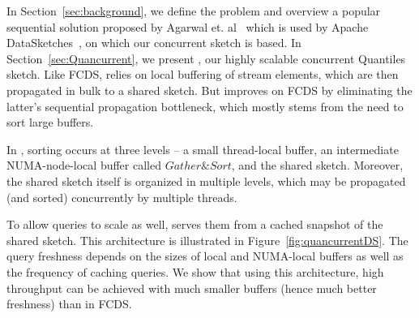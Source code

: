 In Section~\ref{sec:background}, we define the problem and overview a popular sequential solution proposed by Agarwal et. al~\cite{mergeables_summaries} which is used by Apache DataSketches~\cite{DataSketches}, on which our concurrent sketch is based.
In Section~\ref{sec:Quancurrent}, we present \mysketch, our highly scalable concurrent Quantiles sketch.
Like FCDS, \mysketch relies on local buffering of stream elements, which are then propagated in bulk to a shared sketch.
But \mysketch improves on FCDS by eliminating the latter's sequential propagation bottleneck, which mostly stems from the need to sort large buffers.

In \mysketch, sorting occurs at three levels – a small thread-local buffer, an intermediate NUMA-node-local buffer called $\mathit{Gather\&Sort}$, and the shared sketch.
Moreover, the shared sketch itself is organized in multiple levels, which may be propagated (and sorted) concurrently by multiple threads.

To allow queries to scale as well, \mysketch serves them from a cached snapshot of the shared sketch.
This architecture is illustrated in Figure~\ref{fig:quancurrentDS}.
The query freshness depends on the sizes of local and NUMA-local buffers as well as the frequency of caching queries.
We show that using this architecture, high throughput can be achieved with much smaller buffers (hence much better freshness) than in FCDS.



